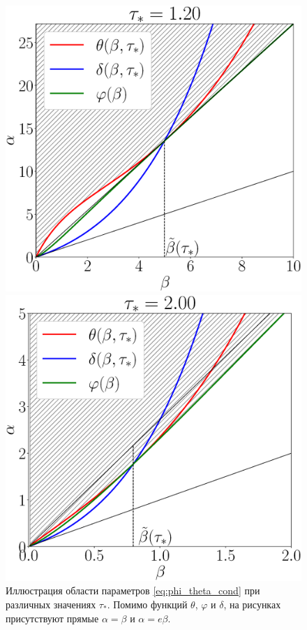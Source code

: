 \begin{figure}
	\centering
	\begin{minipage}{.45\linewidth}
		\includegraphics[width=\linewidth]{images/conditions_tau_1p20.eps}
	\end{minipage}
	\hspace{.05\linewidth}
	\begin{minipage}{.45\linewidth}
		\includegraphics[width=\linewidth]{images/conditions_tau_2p00.eps}
	\end{minipage}
	\caption{Иллюстрация области параметров \eqref{eq:phi_theta_cond} при различных значениях $\tau_*$. Помимо функций $\theta$, $\varphi$ и $\delta$, на рисунках присутствуют прямые $\alpha = \beta$ и $\alpha = e\beta$.}
	\label{fig:step3_t1}
\end{figure}

